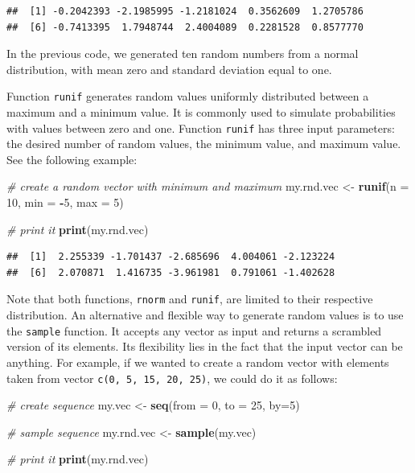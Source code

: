 \documentclass[11pt,]{book}
\newenvironment{Shaded}{\begin{snugshade}}{\end{snugshade}}
\newcommand{\KeywordTok}[1]{\textcolor[rgb]{0.27,0.27,0.27}{\textbf{#1}}}
\newcommand{\DataTypeTok}[1]{\textcolor[rgb]{0.27,0.27,0.27}{#1}}
\newcommand{\DecValTok}[1]{\textcolor[rgb]{0.06,0.06,0.06}{#1}}
\newcommand{\StringTok}[1]{\textcolor[rgb]{0.5,0.5,0.5}{#1}}
\newcommand{\CommentTok}[1]{\textcolor[rgb]{0.56,0.35,0.01}{\textit{#1}}}
\newcommand{\OperatorTok}[1]{\textcolor[rgb]{0.81,0.36,0.00}{\textbf{#1}}}
\newcommand{\NormalTok}[1]{#1}
\begin{document}
\begin{verbatim}
##  [1] -0.2042393 -2.1985995 -1.2181024  0.3562609  1.2705786
##  [6] -0.7413395  1.7948744  2.4004089  0.2281528  0.8577770
\end{verbatim}

In the previous code, we generated ten random numbers from a normal
distribution, with mean zero and standard deviation equal to one.

Function \texttt{runif} generates random values uniformly distributed
between a maximum and a minimum value. It is commonly used to simulate
probabilities with values between zero and one. Function \texttt{runif}
has three input parameters: the desired number of random values, the
minimum value, and maximum value. See the following example:

\begin{Shaded}
\begin{Highlighting}[]
\CommentTok{# create a random vector with minimum and maximum}
\NormalTok{my.rnd.vec <-}\StringTok{ }\KeywordTok{runif}\NormalTok{(}\DataTypeTok{n =} \DecValTok{10}\NormalTok{, }\DataTypeTok{min =} \OperatorTok{-}\DecValTok{5}\NormalTok{, }\DataTypeTok{max =} \DecValTok{5}\NormalTok{)}

\CommentTok{# print it}
\KeywordTok{print}\NormalTok{(my.rnd.vec)}
\end{Highlighting}
\end{Shaded}

\begin{verbatim}
##  [1]  2.255339 -1.701437 -2.685696  4.004061 -2.123224
##  [6]  2.070871  1.416735 -3.961981  0.791061 -1.402628
\end{verbatim}

Note that both functions, \texttt{rnorm} and \texttt{runif}, are limited
to their respective distribution. An alternative and flexible way to
generate random values is to use the \texttt{sample} function. It
accepts any vector as input and returns a scrambled version of its
elements. Its flexibility lies in the fact that the input vector can be
anything. For example, if we wanted to create a random vector with
elements taken from vector \texttt{c(0,\ 5,\ 15,\ 20,\ 25)}, we could do
it as follows: 

\begin{Shaded}
\begin{Highlighting}[]
\CommentTok{# create sequence}
\NormalTok{my.vec <-}\StringTok{ }\KeywordTok{seq}\NormalTok{(}\DataTypeTok{from =} \DecValTok{0}\NormalTok{, }\DataTypeTok{to =} \DecValTok{25}\NormalTok{, }\DataTypeTok{by=}\DecValTok{5}\NormalTok{)}

\CommentTok{# sample sequence}
\NormalTok{my.rnd.vec <-}\StringTok{ }\KeywordTok{sample}\NormalTok{(my.vec)}

\CommentTok{# print it}
\KeywordTok{print}\NormalTok{(my.rnd.vec)}
\end{Highlighting}
\end{Shaded}
\end{document}
